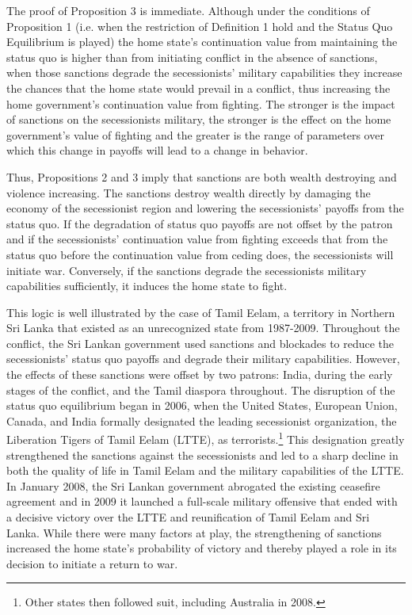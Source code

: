 \documentclass[11pt,letterpaper, notitlepage]{article}
\begin{document}
The proof of Proposition 3 is immediate. Although under the conditions of Proposition 1 (i.e. when the restriction of Definition 1 hold and the Status Quo Equilibrium is played) the home state's continuation value from maintaining the status quo is higher than from initiating conflict in the absence of sanctions, when those sanctions degrade the secessionists' military capabilities they increase the chances that the home state would prevail in a conflict, thus increasing the home government's continuation value from fighting. The stronger is the impact of sanctions on the secessionists military, the stronger is the effect on the home government's value of fighting and the greater is the range of parameters over which this change in payoffs will lead to a change in behavior.

Thus, Propositions 2 and 3 imply that sanctions are both wealth destroying and violence increasing. The sanctions destroy wealth directly by damaging the economy of the secessionist region and lowering the secessionists' payoffs from the status quo. If the degradation of status quo payoffs are not offset by the patron and if the secessionists' continuation value from fighting exceeds that from the status quo before the continuation value from ceding does, the secessionists will initiate war. Conversely, if the sanctions degrade the secessionists military capabilities sufficiently, it induces the home state to fight.

This logic is well illustrated by the case of Tamil Eelam, a territory in Northern Sri Lanka that existed as an unrecognized state from 1987-2009. Throughout the conflict, the Sri Lankan government used sanctions and blockades to reduce the secessionists' status quo payoffs and degrade their military capabilities. However, the effects of these sanctions were offset by two patrons: India, during the early stages of the conflict, and the Tamil diaspora throughout. The disruption of the status quo equilibrium began in 2006, when the United States, European Union, Canada, and India formally designated the leading secessionist organization, the Liberation Tigers of Tamil Eelam (LTTE), as terrorists.\footnote{Other states then followed suit, including Australia in 2008.} This designation greatly strengthened the sanctions against the secessionists and led to a sharp decline in both the quality of life in Tamil Eelam and the military capabilities of the LTTE. In January 2008, the Sri Lankan government abrogated the existing ceasefire agreement and in 2009 it launched a full-scale military offensive that ended with a decisive victory over the LTTE and reunification of Tamil Eelam and Sri Lanka. While there were many factors at play, the strengthening of sanctions increased the home state's probability of victory and thereby played a role in its decision to initiate a return to war.
\end{document}
